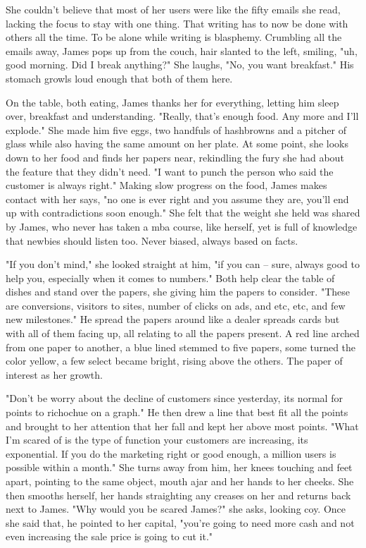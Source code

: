         She couldn't believe that most of her users were like the fifty emails she read, lacking the focus to stay with one thing. That writing
    has to now be done with others all the time. To be alone while writing is blasphemy. Crumbling all the emails away, James pops up from the
    couch, hair slanted to the left, smiling, "uh, good morning. Did I break anything?" She laughs, "No, you want breakfast." His stomach
    growls loud enough that both of them here.

        On the table, both eating, James thanks her for everything, letting him sleep over, breakfast and understanding. "Really, that's enough
    food. Any more and I'll explode." She made him five eggs, two handfuls of hashbrowns and a pitcher of glass while also having the same
    amount on her plate. At some point, she looks down to her food and finds her papers near, rekindling the fury she had about the feature
    that they didn't need. "I want to punch the person who said the customer is always right." Making slow progress on the food, James makes
    contact with her says, "no one is ever right and you assume they are, you'll end up with contradictions soon enough." She felt that the
    weight she held was shared by James, who never has taken a mba course, like herself, yet is full of knowledge that newbies should
    listen too. Never biased, always based on facts.

       "If you don't mind," she looked straight at him, "if you can -- sure, always good to help you, especially when it comes to numbers." Both
    help clear the table of dishes and stand over the papers, she giving him the papers to consider. "These are conversions, visitors to sites,
    number of clicks on ads, and etc, etc, and few new milestones." He spread the papers around like a dealer spreads cards but with all of them
    facing up, all relating to all the papers present. A red line arched from one paper to another, a blue lined stemmed to five papers, some
    turned the color yellow, a few select became bright, rising above the others. The paper of interest as her growth.

        "Don't be worry about the decline of customers since yesterday, its normal for points to richochue on a graph." He then drew a line that
    best fit all the points and brought to her attention that her fall and kept her above most points. "What I'm scared of is the type of function
    your customers are increasing, its exponential. If you do the marketing right or good enough, a million users is possible within a month." 
    She turns away from him, her knees touching and feet apart, pointing to the same object, mouth ajar and her hands to her cheeks. She then 
    smooths herself, her hands straighting any creases on her and returns back next to James. "Why would you be scared James?" she asks, looking
    coy. Once she said that, he pointed to her capital, "you're going to need more cash and not even increasing the sale price is going to cut
    it."

